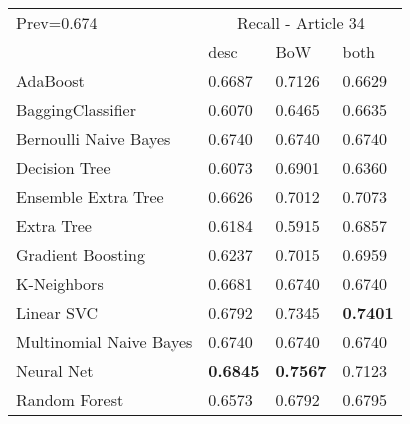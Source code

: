 \begin{tabular}{|l|l|l|l| }
\hline
Prev=0.674 &  \multicolumn{3}{c|}{Recall - Article 34} \\
\cline{2-4} & desc & BoW & both \\ \hline
AdaBoost                & 0.6687 & 0.7126 & 0.6629\\
BaggingClassifier       & 0.6070 & 0.6465 & 0.6635\\
Bernoulli Naive Bayes   & 0.6740 & 0.6740 & 0.6740\\
Decision Tree           & 0.6073 & 0.6901 & 0.6360\\
Ensemble Extra Tree     & 0.6626 & 0.7012 & 0.7073\\
Extra Tree              & 0.6184 & 0.5915 & 0.6857\\
Gradient Boosting       & 0.6237 & 0.7015 & 0.6959\\
K-Neighbors             & 0.6681 & 0.6740 & 0.6740\\
Linear SVC              & 0.6792 & 0.7345 & {\bf 0.7401}\\
Multinomial Naive Bayes & 0.6740 & 0.6740 & 0.6740\\
Neural Net              & {\bf 0.6845} & {\bf 0.7567} & 0.7123\\
Random Forest           & 0.6573 & 0.6792 & 0.6795\\
\hline
\end{tabular}